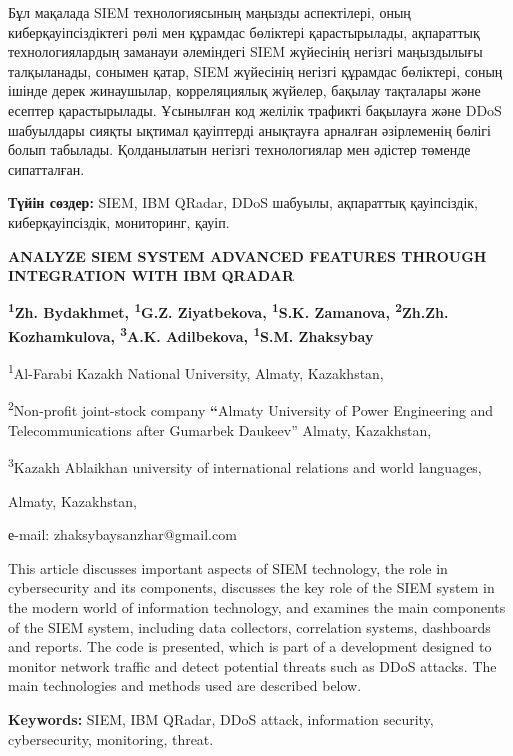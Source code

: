 Бұл мақалада SIEM технологиясының маңызды аспектілері, оның
киберқауіпсіздіктегі рөлі мен құрамдас бөліктері қарастырылады,
ақпараттық технологиялардың заманауи әлеміндегі SIEM жүйесінің негізгі
маңыздылығы талқыланады, сонымен қатар, SIEM жүйесінің негізгі құрамдас
бөліктері, соның ішінде дерек жинаушылар, корреляциялық жүйелер, бақылау
тақталары және есептер қарастырылады. Ұсынылған код желілік трафикті
бақылауға және DDoS шабуылдары сияқты ықтимал қауіптерді анықтауға
арналған әзірлеменің бөлігі болып табылады. Қолданылатын негізгі
технологиялар мен әдістер төменде сипатталған.

{\bfseries Түйін сөздер:} SIEM, IBM QRadar, DDoS шабуылы, ақпараттық
қауіпсіздік, киберқауіпсіздік, мониторинг, қауіп.

\begin{center}
{\large\bfseries ANALYZE SIEM SYSTEM ADVANCED FEATURES THROUGH INTEGRATION WITH
IBM QRADAR}

{\bfseries \textsuperscript{1}Zh. Bydakhmet, \textsuperscript{1}G.Z.
Ziyatbekova, \textsuperscript{1}S.K. Zamanova, \textsuperscript{2}Zh.Zh.
Kozhamkulova, \textsuperscript{3}A.K. Adilbekova, \textsuperscript{1}S.M.
Zhaksybay}

\textsuperscript{1}Al-Farabi Kazakh National University, Almaty,
Kazakhstan,

\textsuperscript{2}Non-profit joint-stock company {\bfseries ``}Almaty
University of Power Engineering and Telecommunications after Gumarbek
Daukeev'' Almaty, Kazakhstan,

\textsuperscript{3}Kazakh Ablaikhan university of international
relations and world languages,

Almaty, Kazakhstan,

е-mail: zhaksybaysanzhar@gmail.com
\end{center}

This article discusses important aspects of SIEM technology, the role in
cybersecurity and its components, discusses the key role of the SIEM
system in the modern world of information technology, and examines the
main components of the SIEM system, including data collectors,
correlation systems, dashboards and reports. The code is presented,
which is part of a development designed to monitor network traffic and
detect potential threats such as DDoS attacks. The main technologies and
methods used are described below.

{\bfseries Keywords:} SIEM, IBM QRadar, DDoS attack, information security,
cybersecurity, monitoring, threat.

